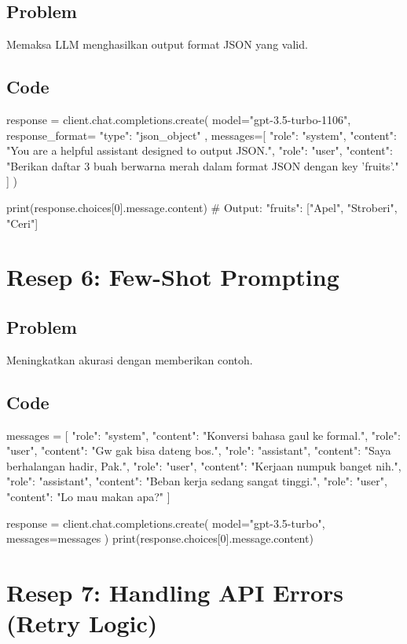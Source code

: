 \subsection*{Problem}
Memaksa LLM menghasilkan output format JSON yang valid.

\subsection*{Code}
\begin{codeblock}[language=Python]
response = client.chat.completions.create(
  model="gpt-3.5-turbo-1106",
  response_format={ "type": "json_object" },
  messages=[
    {"role": "system", "content": "You are a helpful assistant designed to output JSON."},
    {"role": "user", "content": "Berikan daftar 3 buah berwarna merah dalam format JSON dengan key 'fruits'."}
  ]
)

print(response.choices[0].message.content)
# Output: { "fruits": ["Apel", "Stroberi", "Ceri"] }
\end{codeblock}

\section{Resep 6: Few-Shot Prompting}

\subsection*{Problem}
Meningkatkan akurasi dengan memberikan contoh.

\subsection*{Code}
\begin{codeblock}[language=Python]
messages = [
    {"role": "system", "content": "Konversi bahasa gaul ke formal."},
    {"role": "user", "content": "Gw gak bisa dateng bos."},
    {"role": "assistant", "content": "Saya berhalangan hadir, Pak."},
    {"role": "user", "content": "Kerjaan numpuk banget nih."},
    {"role": "assistant", "content": "Beban kerja sedang sangat tinggi."},
    {"role": "user", "content": "Lo mau makan apa?"}
]

response = client.chat.completions.create(
    model="gpt-3.5-turbo",
    messages=messages
)
print(response.choices[0].message.content)
\end{codeblock}

\section{Resep 7: Handling API Errors (Retry Logic)}

